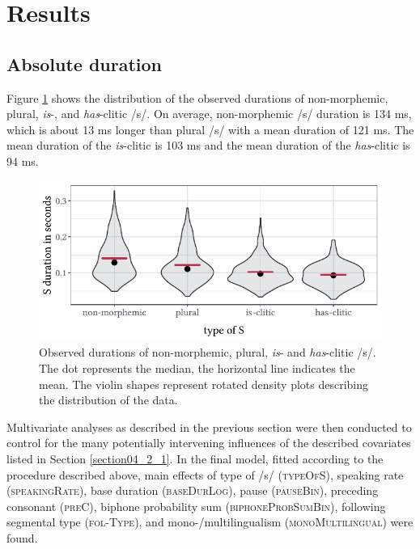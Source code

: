 \section{Results}\label{section04_3}

\subsection{Absolute duration}\label{section04_3_1}

Figure \ref{fig:4_3} shows the distribution of the observed durations of non-morphemic, plural, \textit{is}-, and \textit{has}-clitic /s/. On average, non-morphemic /s/ duration is 134 ms, which is about 13 ms longer than plural /s/ with a mean duration of 121 ms. The mean duration of the \textit{is}-clitic is 103 ms and the mean duration of the \textit{has}-clitic is 94 ms. 

\begin{figure}
    \centering
    \includegraphics[]{figures/fig4.3.pdf}
    \caption{Observed durations of non-morphemic, plural, \textit{is}- and \textit{has}-clitic /s/. The dot represents the median, the horizontal line indicates the mean. The violin shapes represent rotated density plots describing the distribution of the data.}
    \label{fig:4_3}
\end{figure}

Multivariate analyses as described in the previous section were then conducted to control for the many potentially intervening influences of the described covariates listed in Section \ref{section04_2_1}. In the final model, fitted according to the procedure described above, main effects of type of /s/ (\textsc{typeOfS}), speaking rate (\textsc{speakingRate}), base duration (\textsc{baseDurLog}), pause (\textsc{pauseBin}), preceding consonant (\textsc{preC}), biphone probability sum (\textsc{biphoneProbSumBin}), following segmental type (\textsc{fol-Type}), and mono-/multilingualism (\textsc{monoMultilingual}) were found.

